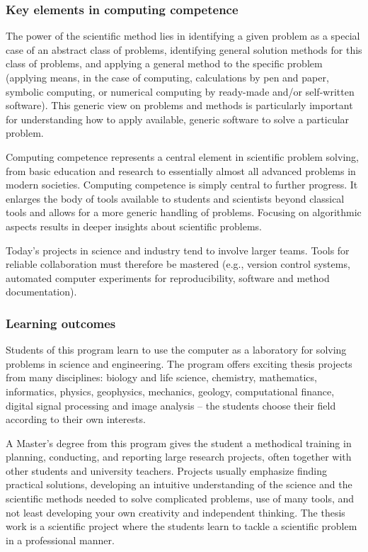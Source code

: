 \documentclass{beamer}
\begin{document}
\begin{frame}
\frametitle{Key elements in computing competence}

\begin{block}{}
The power of the scientific method lies in identifying a given problem
as a special case of an abstract class of problems, identifying
general solution methods for this class of problems, and applying a
general method to the specific problem (applying means, in the case of
computing, calculations by pen and paper, symbolic computing, or
numerical computing by ready-made and/or self-written software). This
generic view on problems and methods is particularly important for
understanding how to apply available, generic software to solve a
particular problem.


Computing competence represents a central element
in scientific problem solving, from basic education and research to
essentially almost all advanced problems in modern
societies. Computing competence is simply central to further
progress. It enlarges the body of tools available to students and
scientists beyond classical tools and allows for a more generic
handling of problems. Focusing on algorithmic aspects results in
deeper insights about scientific problems.

Today's projects in science and industry tend to involve larger teams. Tools for reliable collaboration must therefore be mastered (e.g., version control systems, automated computer experiments for reproducibility, software and method documentation).
\end{block}
\end{frame}

\begin{frame}
\frametitle{Learning outcomes}

\begin{block}{}
Students of this program learn to use the computer as a laboratory for solving problems in science and engineering. The program offers exciting thesis projects from many disciplines: biology and life science, chemistry, mathematics, informatics, physics, geophysics, mechanics, geology, computational finance, digital signal processing and image analysis  – the students choose their  field according to their own interests.

A Master’s degree from this program gives the student   a methodical training in planning, conducting, and reporting large research projects, often together with other students and university teachers.
Projects usually emphasize finding practical solutions,
developing an intuitive understanding of the science and the
scientific methods needed to solve complicated problems, use of many
tools, and not least developing your own creativity and independent
thinking. The thesis work is a scientific project where the students learn to
tackle a scientific problem in a professional manner.
\end{block}
\end{frame}
\end{document}

